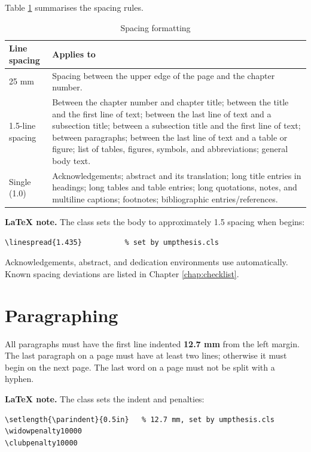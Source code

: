 Table \ref{tab:spacing} summarises the spacing rules.

\begin{table}[htbp]
\caption{Spacing formatting}
\label{tab:spacing}
\begin{tabularx}{\textwidth}{@{} l X @{}}
\toprule
Line spacing & Applies to \\
\midrule
25 mm & Spacing between the upper edge of the page and the chapter number. \\
1.5-line spacing & Between the chapter number and chapter title; between the title and the first line of text; between the last line of text and a subsection title; between a subsection title and the first line of text; between paragraphs; between the last line of text and a table or figure; list of tables, figures, symbols, and abbreviations; general body text. \\
Single (1.0) & Acknowledgements; abstract and its translation; long title entries in headings; long tables and table entries; long quotations, notes, and multiline captions; footnotes; bibliographic entries/references. \\
\bottomrule
\end{tabularx}
\end{table}

\textbf{LaTeX note.} The class sets the body to approximately 1.5 spacing when \texttt{\string\mainmatter} begins:
\begin{verbatim}
\linespread{1.435}          % set by umpthesis.cls
\end{verbatim}
Acknowledgements, abstract, and dedication environments use \texttt{\string\singlespacing} automatically. Known spacing deviations are listed in Chapter \ref{chap:checklist}.

\section{Paragraphing}

All paragraphs must have the first line indented \textbf{12.7 mm} from the left margin. The last paragraph on a page must have at least two lines; otherwise it must begin on the next page. The last word on a page must not be split with a hyphen.

\textbf{LaTeX note.} The class sets the indent and penalties:
\begin{verbatim}
\setlength{\parindent}{0.5in}   % 12.7 mm, set by umpthesis.cls
\widowpenalty10000
\clubpenalty10000
\end{verbatim}

